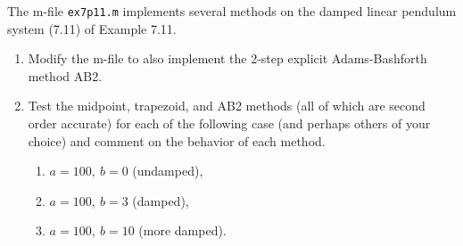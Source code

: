 

The m-file {\tt ex7p11.m} implements several methods on the damped linear
pendulum system (7.11) of Example 7.11.  

\begin{enumerate}
\item Modify the m-file to also implement the 2-step explicit
Adams-Bashforth method AB2.

\item Test the midpoint, trapezoid, and AB2 methods (all of which are second
order accurate) for each of the following case (and perhaps others of your 
choice) and comment on the behavior of each method.

\begin{enumerate}
\item $a = 100, ~b=0$ (undamped),
\item $a = 100, ~b=3$ (damped),
\item $a = 100, ~b=10$ (more damped).
\end{enumerate}

\end{enumerate}

